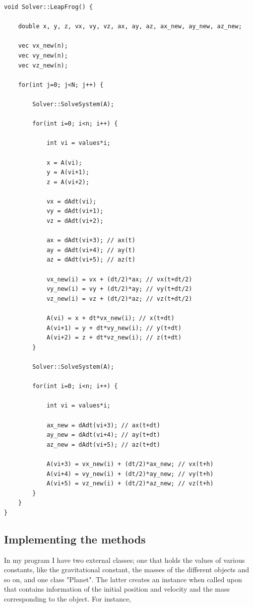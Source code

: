 \documentclass[a4paper,12pt, english]{article}
\begin{document}
 \begin{lstlisting}[title={Function Leap Frog}]
void Solver::LeapFrog() {

    double x, y, z, vx, vy, vz, ax, ay, az, ax_new, ay_new, az_new;

    vec vx_new(n);
    vec vy_new(n);
    vec vz_new(n);

    for(int j=0; j<N; j++) {

        Solver::SolveSystem(A);

        for(int i=0; i<n; i++) {

            int vi = values*i;

            x = A(vi);
            y = A(vi+1);
            z = A(vi+2);

            vx = dAdt(vi);
            vy = dAdt(vi+1);
            vz = dAdt(vi+2);

            ax = dAdt(vi+3); // ax(t)
            ay = dAdt(vi+4); // ay(t)
            az = dAdt(vi+5); // az(t)

            vx_new(i) = vx + (dt/2)*ax; // vx(t+dt/2)
            vy_new(i) = vy + (dt/2)*ay; // vy(t+dt/2)
            vz_new(i) = vz + (dt/2)*az; // vz(t+dt/2)

            A(vi) = x + dt*vx_new(i); // x(t+dt)
            A(vi+1) = y + dt*vy_new(i); // y(t+dt)
            A(vi+2) = z + dt*vz_new(i); // z(t+dt)
        }

        Solver::SolveSystem(A);

        for(int i=0; i<n; i++) {

            int vi = values*i;

            ax_new = dAdt(vi+3); // ax(t+dt)
            ay_new = dAdt(vi+4); // ay(t+dt)
            az_new = dAdt(vi+5); // az(t+dt)

            A(vi+3) = vx_new(i) + (dt/2)*ax_new; // vx(t+h)
            A(vi+4) = vy_new(i) + (dt/2)*ay_new; // vy(t+h)
            A(vi+5) = vz_new(i) + (dt/2)*az_new; // vz(t+h)
        }
    }
}
\end{lstlisting}

\subsection*{Implementing the methods}
In my program I have two external classes; one that holds the values of various constants, like the gravitational constant, the masses of the different objects and so on, and one class "Planet". The latter creates an instance when called upon that contains information of the initial position and velocity and the mass corresponding to the object. For instance,
\end{document}
